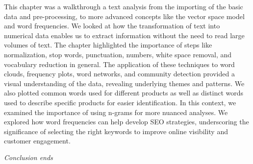This chapter was a walkthrough a text analysis from the importing of the basic data
and pre-processing, to more advanced concepts like the vector space model
and word frequencies. We looked at how the transformation of text into
numerical data enables us to extract information without the need to
read large volumes of text. The chapter highlighted the importance of steps like
normalization, stop words, punctuation, numbers, white space removal, and
vocabulary reduction in general. The application of
these techniques to word clouds, frequency plots, word networks,
and community detection provided a visual understanding of the data,
revealing underlying themes and patterns. We also plotted common words used for
different products as well as distinct words used to describe specific
products for easier identification. In this context, we examined the
importance of using n-grams for more nuanced analyses. We
explored how word frequencies can help develop SEO strategies, underscoring
the significance of selecting the right keywords to improve online
visibility and customer engagement.

\emph{Conclusion ends}
